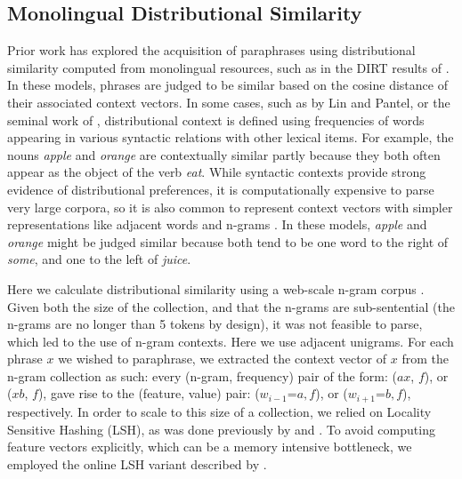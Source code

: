 \documentclass[11pt]{article}
\begin{document}

\subsection{Monolingual Distributional Similarity}\label{section:monolingual-distributional-similarity}
\label{sect:mds}

Prior work has explored the acquisition of paraphrases using distributional
similarity computed from monolingual resources, such as in the DIRT results of
. In these models, phrases are judged to be similar
based on the cosine distance of their associated context vectors. In some cases,
such as by Lin and Pantel, or the seminal work of ,
distributional context is defined using frequencies of words appearing in
various syntactic relations with other lexical items. For example, the nouns
\emph{apple} and \emph{orange} are contextually similar partly because they both
often appear as the object of the verb \emph{eat}. While syntactic contexts
provide strong evidence of distributional preferences, it is computationally
expensive to parse very large corpora, so it is also common to represent context
vectors with simpler representations like adjacent words and n-grams
\cite{LapataKellerSaLP05,BhagatRavichandran08,LinEtAlLREC10,VanDurmeLallACL10}. In
these models, \emph{apple} and \emph{orange} might be judged similar because
both tend to be one word to the right of \emph{some}, and one to the left of
\emph{juice}.

Here we calculate distributional similarity using a web-scale n-gram corpus
\cite{GoogleNgrams,LinEtAlLREC10}. Given both the size of the collection, and
that the n-grams are sub-sentential (the n-grams are no longer than 5 tokens by
design), it was not feasible to parse, which led to the use of n-gram contexts.  Here we use adjacent unigrams.
For each phrase $x$ we wished to paraphrase, we extracted the context vector of
$x$ from the n-gram collection as such: every (n-gram, frequency) pair of the
form: ($a x$, $f$), or ($x b$, $f$), gave rise to the (feature, value) pair:
($w_{i-1}$=$a, f$), or ($w_{i+1}$=$b, f$), respectively. In order to scale to this
size of a collection, we relied on Locality Sensitive Hashing (LSH), as was done
previously by  and . To
avoid computing feature vectors explicitly, which can be a memory intensive
bottleneck, we employed the online LSH variant described by
.
\end{document}
